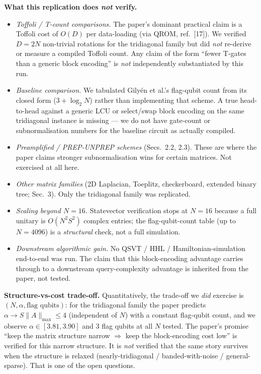 \documentclass[11pt]{article}
\begin{document}
\textbf{What this replication does \emph{not} verify.}
\begin{itemize}
  \item \emph{Toffoli / T-count comparisons.} The paper's dominant
        practical claim is a Toffoli cost of $O(D)$ per data-loading
        (via QROM, ref.~[17]). We verified $D = 2N$ non-trivial
        rotations for the tridiagonal family but did \emph{not}
        re-derive or measure a compiled Toffoli count. Any claim of
        the form ``fewer T-gates than a generic block encoding'' is
        \emph{not} independently substantiated by this run.
  \item \emph{Baseline comparison.} We tabulated Gily\'en et al.'s
        flag-qubit count from its closed form ($3 + \log_2 N$) rather
        than implementing that scheme. A true head-to-head against a
        generic LCU or select/swap block encoding on the same
        tridiagonal instance is missing --- we do not have gate-count
        or subnormalisation numbers for the baseline circuit as
        actually compiled.
  \item \emph{Preamplified / PREP-UNPREP schemes} (Secs.~2.2, 2.3).
        These are where the paper claims stronger subnormalisation
        wins for certain matrices. Not exercised at all here.
  \item \emph{Other matrix families} (2D Laplacian, Toeplitz,
        checkerboard, extended binary tree; Sec.~3). Only the
        tridiagonal family was replicated.
  \item \emph{Scaling beyond $N=16$.} Statevector verification stops at
        $N=16$ because a full unitary is $O(N^2 S^2)$ complex entries;
        the flag-qubit-count table (up to $N=4096$) is a
        \emph{structural} check, not a full simulation.
  \item \emph{Downstream algorithmic gain.} No QSVT / HHL /
        Hamiltonian-simulation end-to-end was run. The claim that this
        block-encoding advantage carries through to a downstream
        query-complexity advantage is inherited from the paper, not
        tested.
\end{itemize}

\textbf{Structure-vs-cost trade-off.}
Quantitatively, the trade-off we \emph{did} exercise is
$(N,\alpha,\text{flag qubits})$: for the tridiagonal family the paper
predicts $\alpha \to S \|A\|_{\max} \le 4$ (independent of $N$) with a
constant flag-qubit count, and we observe $\alpha \in [3.81, 3.90]$
and $3$ flag qubits at all $N$ tested. The paper's promise ``keep the
matrix structure narrow $\Rightarrow$ keep the block-encoding cost
low'' is verified for this narrow structure. It is \emph{not} verified
that the same story survives when the structure is relaxed
(nearly-tridiagonal / banded-with-noise / general-sparse). That is one
of the open questions.
\end{document}
